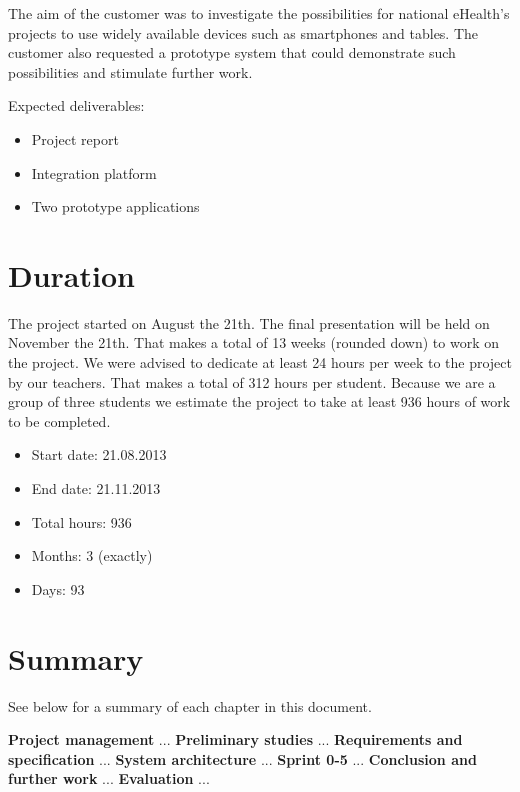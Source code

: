 The aim of the customer was to investigate the possibilities for national eHealth's projects to use widely available
devices such as smartphones and tables. The customer also requested a prototype system that could demonstrate such
possibilities and stimulate further work.

Expected deliverables:
\begin{itemize}
\item Project report
\item Integration platform
\item Two prototype applications
\end{itemize}

\section{Duration}
\label{section:duration}
The project started on August the 21th. The final presentation will be held on November the 21th.
That makes a total of 13 weeks (rounded down) to work on the project.
We were advised to dedicate at least 24 hours per week to the project by our teachers.
That makes a total of 312 hours per student. Because we are a group of three students we estimate
the project to take at least 936 hours of work to be completed.

\begin{itemize}
\item Start date: 21.08.2013
\item End date: 21.11.2013
\item Total hours: 936
\item Months: 3 (exactly)
\item Days: 93
\end{itemize}

\section{Summary}

See below for a summary of each chapter in this document.

\textbf{Project management}\newline
...
\textbf{Preliminary studies}\newline
...
\textbf{Requirements and specification}\newline
...
\textbf{System architecture}\newline
...
\textbf{Sprint 0-5}\newline
...
\textbf{Conclusion and further work}\newline
...
\textbf{Evaluation}\newline
...
